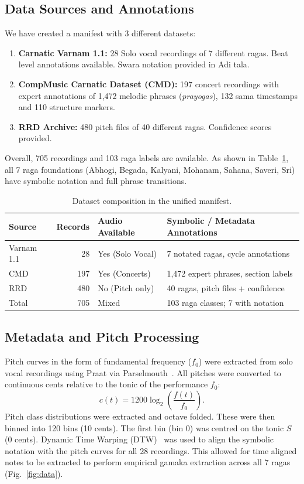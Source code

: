 \documentclass[conference,letterpaper]{IEEEtran}
\begin{document}
\subsection{Data Sources and Annotations}
We have created a manifest with 3 different datasets:
\begin{enumerate}
    \item \textbf{Carnatic Varnam 1.1:} 28 Solo vocal recordings of 7 different ragas. Beat level annotations available. Swara notation provided in Adi tala.
    \item \textbf{CompMusic Carnatic Dataset (CMD):} 197 concert recordings with expert annotations of 1,472 melodic phrases (\textit{prayogas}), 132 sama timestamps and 110 structure markers.
    \item \textbf{RRD Archive:} 480 pitch files of 40 different ragas. Confidence scores provided.
\end{enumerate}
Overall, 705 recordings and 103 raga labels are available. As shown in Table~\ref{tab:data}, all 7 raga foundations (Abhogi, Begada, Kalyani, Mohanam, Sahana, Saveri, Sri) have symbolic notation and full phrase transitions.

\begin{table}[t]
\caption{Dataset composition in the unified manifest.}
\label{tab:data}
\centering\footnotesize
\begin{tabular}{@{}lrlp{}@{}}
\toprule
Source & Records & Audio Available & Symbolic / Metadata Annotations\\
\midrule
Varnam 1.1 & 28 & Yes (Solo Vocal) & 7 notated ragas, cycle annotations\\
CMD & 197 & Yes (Concerts) & 1,472 expert phrases, section labels\\
RRD & 480 & No (Pitch only) & 40 ragas, pitch files + confidence\\
\midrule
Total & 705 & Mixed & 103 raga classes; 7 with notation\\
\bottomrule
\end{tabular}
\end{table}

\subsection{Metadata and Pitch Processing}
Pitch curves in the form of fundamental frequency ($f_0$) were extracted from solo vocal recordings using Praat via Parselmouth~\cite{jadoul2018}. All pitches were converted to continuous cents relative to the tonic of the performance $f_0$:
\begin{equation}
 c(t) = 1200 \log_2\!\left(\frac{f(t)}{f_0}\right).
\end{equation}
Pitch class distributions were extracted and octave folded. These were then binned into 120 bins (10 cents). The first bin (bin 0) was centred on the tonic $S$ (0 cents). Dynamic Time Warping (DTW)~\cite{sakoe1978} was used to align the symbolic notation with the pitch curves for all 28 recordings. This allowed for time aligned notes to be extracted to perform empirical gamaka extraction across all 7 ragas (Fig.~\ref{fig:data}).
\end{document}
